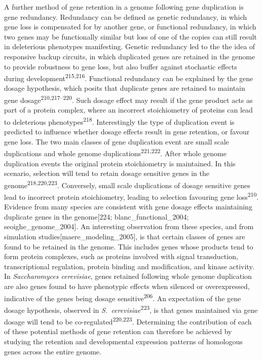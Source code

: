 \documentclass[12pt,]{book}
\begin{document}
A further method of gene retention in a genome following gene
duplication is gene redundancy. Redundancy can be defined as genetic
redundancy, in which gene loss is compensated for by another gene, or
functional redundancy, in which two genes may be functionally similar
but loss of one of the copies can still result in deleterious phenotypes
manifesting. Genetic redundancy led to the the idea of responsive backup
circuits, in which duplicated genes are retained in the genome to
provide robustness to gene loss, but also buffer against stochastic
effects during development\textsuperscript{215,216}. Functional
redundancy can be explained by the gene dosage hypothesis, which posits
that duplicate genes are retained to maintain gene
dosage\textsuperscript{210,217--220}. Such dosage effect may result if
the gene product acts as part of a protein complex, where an incorrect
stoichiometry of proteins can lead to deleterious
phenotypes\textsuperscript{218}. Interestingly the type of duplication
event is predicted to influence whether dosage effects result in gene
retention, or favour gene loss. The two main classes of gene duplication
event are small scale duplications and whole genome
duplications\textsuperscript{221,222}. After whole genome duplication
events the original protein stoichiometry is maintained. In this
scenario, selection will tend to retain dosage sensitive genes in the
genome\textsuperscript{218,220,223}. Conversely, small scale
duplications of dosage sensitive genes lead to incorrect protein
stoichiometry, leading to selection favouring gene
loss\textsuperscript{210}. Evidence from many species are consistent
with gene dosage effects maintaining duplicate genes in the
genome{[}224; blanc\_functional\_2004; seoighe\_genome\_2004{]}. An
interesting observation from these species, and from simulation
studies{[}maere\_modeling\_2005{]}, is that certain classes of genes are
found to be retained in the genome. This includes genes whose products
tend to form protein complexes, such as proteins involved with signal
transduction, transcriptional regulation, protein binding and
modification, and kinase activity. In \emph{Saccharomyces cerevisiae},
genes retained following whole genome duplication are also genes found
to have phenotypic effects when silenced or overexpressed, indicative of
the genes being dosage sensitive\textsuperscript{206}. An expectation of
the gene dosage hypothesis, observed in
\emph{S.~cerevisiae}\textsuperscript{223}, is that genes maintained via
gene dosage will tend to be co-regulated\textsuperscript{220,223}.
Determining the contribution of each of these potential methods of gene
retention can therefore be achieved by studying the retention and
developmental expression patterns of homologous genes across the entire
genome.
\end{document}
